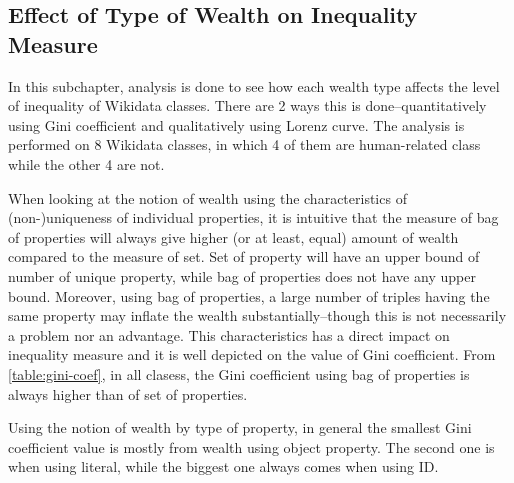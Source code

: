 \subsection{Effect of Type of Wealth on Inequality Measure} \label{wealth & gini}

% 
% 
% 

In this subchapter, analysis is done to see how each wealth type affects the level of inequality of Wikidata classes. There are 2 ways this is done--quantitatively using Gini coefficient and qualitatively using Lorenz curve. The analysis is performed on 8 Wikidata classes, in which 4 of them are human-related class while the other 4 are not.

When looking at the notion of wealth using the characteristics of (non-)uniqueness of individual properties, it is intuitive that the measure of bag of properties will always give higher (or at least, equal) amount of wealth compared to the measure of set. Set of property will have an upper bound of number of unique property, while bag of properties does not have any upper bound. Moreover, using bag of properties, a large number of triples having the same property may inflate the wealth substantially--though this is not necessarily a problem nor an advantage. This characteristics has a direct impact on inequality measure and it is well depicted on the value of Gini coefficient. From \autoref{table:gini-coef}, in all clasess, the Gini coefficient using bag of properties is always higher than of set of properties.

Using the notion of wealth by type of property, in general the smallest Gini coefficient value is mostly from wealth using object property. The second one is when using literal, while the biggest one always comes when using ID.

